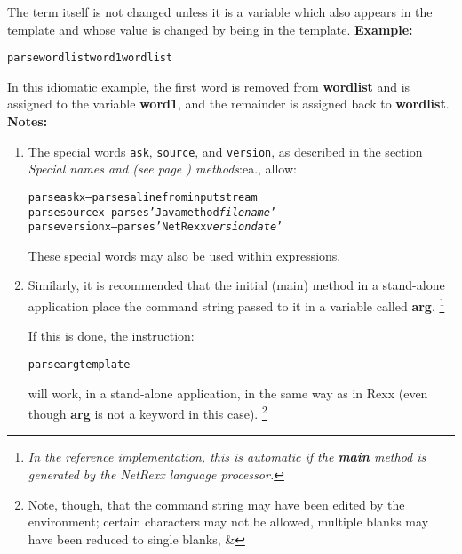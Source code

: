 The term itself is not changed unless it is a variable which also
appears in the template and whose value is changed by being in the
template.
 \textbf{Example:}
\begin{alltt}
parse wordlist word1 wordlist
\end{alltt}
In this idiomatic example, the first word is removed
from \textbf{wordlist} and is assigned to the
variable \textbf{word1}, and the remainder is assigned back
to \textbf{wordlist}.
 \textbf{Notes:}
\begin{enumerate}
\item 
The special words \texttt{ask}, \texttt{source}, and \texttt{version},
as described in the section  \emph{Special names and (see page \pageref{refspecial}) 
methods}:ea., allow:
\begin{alltt}
parse ask x     -- parses a line from input stream
parse source x  -- parses 'Java method \emph{filename}'
parse version x -- parses 'NetRexx \emph{version} \emph{date}'
\end{alltt}
These special words may also be used within expressions.
\item 
Similarly, it is recommended that the initial (main) method in a
stand-alone application place the command string passed to it in a
variable called \textbf{arg}.
\footnote{
\emph{In the reference implementation, this is automatic if
the \textbf{main} method is generated by the NetRexx language
processor.}
}
 
If this is done, the instruction:
\begin{alltt}
parse arg template
\end{alltt}
will work, in a stand-alone application, in the same way as in Rexx
(even though \textbf{arg} is not a keyword in this case).
\footnote{
Note, though, that the command string may have been edited by the
environment; certain characters may not be allowed, multiple blanks may
have been reduced to single blanks, \&
}
\end{enumerate}
